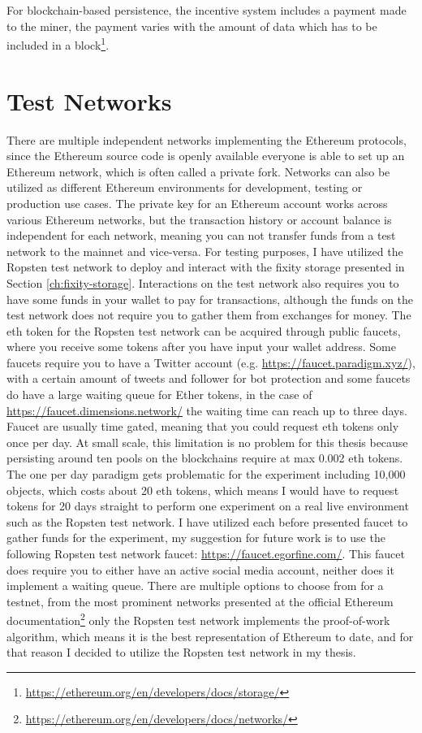 For blockchain-based persistence, the incentive system includes a payment made to the miner, the payment varies with the amount of data which has to be included in a block\footnote{\url{https://ethereum.org/en/developers/docs/storage/}}.

\section{Test Networks}\label{sec:test-nets}
There are multiple independent networks implementing the Ethereum protocols, since the Ethereum source code is openly available everyone is able to set up an Ethereum network, which is often called a private fork. Networks can also be utilized as different Ethereum environments for development, testing or production use cases. The private key for an Ethereum account works across various Ethereum networks, but the transaction history or account balance is independent for each network, meaning you can not transfer funds from a test network to the mainnet and vice-versa. For testing purposes, I have utilized the Ropsten test network to deploy and interact with the fixity storage presented in Section \ref{ch:fixity-storage}. Interactions on the test network also requires you to have some funds in your wallet to pay for transactions, although the funds on the test network does not require you to gather them from exchanges for money. The \acrlong{eth} token for the Ropsten test network can be acquired through public faucets, where you receive some tokens after you have input your wallet address. Some faucets require you to have a Twitter account (e.g. \url{https://faucet.paradigm.xyz/}), with a certain amount of tweets and follower for bot protection and some faucets do have a large waiting queue for Ether tokens, in the case of \url{https://faucet.dimensions.network/} the waiting time can reach up to three days. Faucet are usually time gated, meaning that you could request \acrlong{eth} tokens only once per day. At small scale, this limitation is no problem for this thesis because persisting around ten pools on the blockchains require at max 0.002 \acrlong{eth} tokens. The one per day paradigm gets problematic for the experiment including 10,000 objects, which costs about 20 \acrlong{eth} tokens, which means I would have to request tokens for 20 days straight to perform one experiment on a real live environment such as the Ropsten test network. I have utilized each before presented faucet to gather funds for the experiment, my suggestion for future work is to use the following Ropsten test network faucet: \url{https://faucet.egorfine.com/}. This faucet does require you to either have an active social media account, neither does it implement a waiting queue.
There are multiple options to choose from for a testnet, from the most prominent networks presented at the official Ethereum documentation\footnote{\url{https://ethereum.org/en/developers/docs/networks/}} only the Ropsten test network implements the proof-of-work algorithm, which means it is the best representation of Ethereum to date, and for that reason I decided to utilize the Ropsten test network in my thesis.

